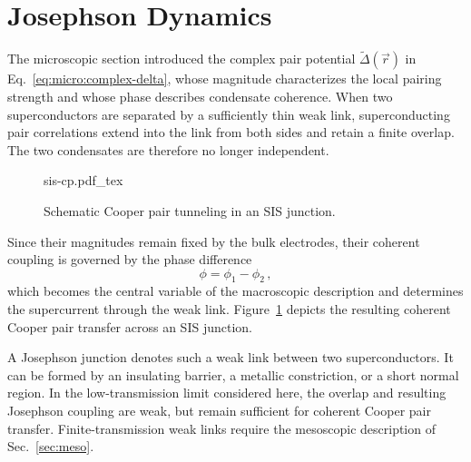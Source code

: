 \newpage
\section{Josephson Dynamics}
\label{sec:macro}

    The microscopic section introduced the complex pair potential $\widetilde{\Delta}(\vec r)$ in Eq.~\eqref{eq:micro:complex-delta}, whose magnitude characterizes the local pairing strength and whose phase describes condensate coherence. When two superconductors are separated by a sufficiently thin weak link, superconducting pair correlations extend into the link from both sides and retain a finite overlap. The two condensates are therefore no longer independent. 
     
    \begin{figure}
        \captionsetup{format=plain}%
        \centering
        \vspace{-1.25em}
        {sis-cp.pdf_tex}
        \vspace{-.5em}
        \caption{Schematic Cooper pair tunneling in an SIS junction.}
        \label{fig:macro:schematic}
    \end{figure}
    
    Since their magnitudes remain fixed by the bulk electrodes, their coherent coupling is governed by the phase difference
    \begin{equation}
        \phi = \phi_1 - \phi_2\,,
        \label{eq:macro:phase-difference}
    \end{equation}
    which becomes the central variable of the macroscopic description and determines the supercurrent through the weak link. Figure~\ref{fig:macro:schematic} depicts the resulting coherent Cooper pair transfer across an SIS junction.

    A Josephson junction denotes such a weak link between two superconductors. It can be formed by an insulating barrier, a metallic constriction, or a short normal region. In the low-transmission limit considered here, the overlap and resulting Josephson coupling are weak, but remain sufficient for coherent Cooper pair transfer. Finite-transmission weak links require the mesoscopic description of Sec.~\ref{sec:meso}. \cite{josephson_possible_1962,likharev_superconducting_1979}

